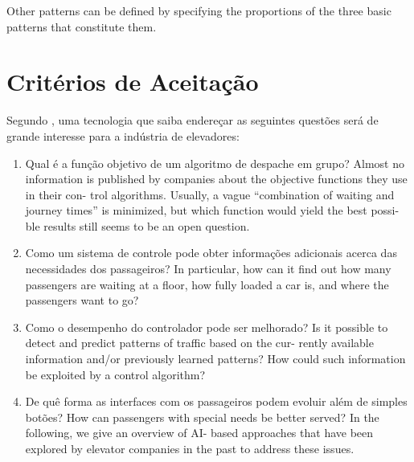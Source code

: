 Other patterns can be defined by specifying the proportions of the three basic patterns that constitute them.

\section{Critérios de Aceitação}

Segundo \cite{KOEHLEROTTIGER02}, uma tecnologia que saiba endereçar as seguintes questões será de grande interesse para a indústria de elevadores:

\begin{enumerate}
\item Qual é a função objetivo de um algoritmo de despache em grupo? \hfill \newline
      Almost no information is published by companies about the objective functions they use in their con- trol algorithms. Usually, a vague “combination of waiting and journey times” is minimized, but which function would yield the best possi- ble results still seems to be an open question.

\item Como um sistema de controle pode obter informações adicionais acerca das necessidades dos passageiros?\hfill \newline
      In particular, how can it find out how many passengers are waiting at a floor, how fully loaded a car is, and where the passengers want to go?

\item Como o desempenho do controlador pode ser melhorado? \hfill \newline
      Is it possible to detect and predict patterns of traffic based on the cur- rently available information and/or previously learned patterns? How could such information be exploited by a control algorithm?

\item De quê forma as interfaces com os passageiros podem evoluir além de simples botões? \hfill \newline
      How can passengers with special needs be better served? In the following, we give an overview of AI- based approaches that have been explored by elevator companies in the past to address these issues.
\end{enumerate}



